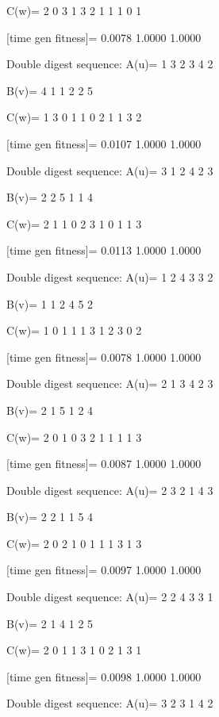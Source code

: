 C(w)=
     2     0     3     1     3     2     1     1     1     0     1

[time gen fitness]=
    0.0078    1.0000    1.0000

Double digest sequence:
A(u)=
     1     3     2     3     4     2

B(v)=
     4     1     1     2     2     5

C(w)=
     1     3     0     1     1     0     2     1     1     3     2

[time gen fitness]=
    0.0107    1.0000    1.0000

Double digest sequence:
A(u)=
     3     1     2     4     2     3

B(v)=
     2     2     5     1     1     4

C(w)=
     2     1     1     0     2     3     1     0     1     1     3

[time gen fitness]=
    0.0113    1.0000    1.0000

Double digest sequence:
A(u)=
     1     2     4     3     3     2

B(v)=
     1     1     2     4     5     2

C(w)=
     1     0     1     1     1     3     1     2     3     0     2

[time gen fitness]=
    0.0078    1.0000    1.0000

Double digest sequence:
A(u)=
     2     1     3     4     2     3

B(v)=
     2     1     5     1     2     4

C(w)=
     2     0     1     0     3     2     1     1     1     1     3

[time gen fitness]=
    0.0087    1.0000    1.0000

Double digest sequence:
A(u)=
     2     3     2     1     4     3

B(v)=
     2     2     1     1     5     4

C(w)=
     2     0     2     1     0     1     1     1     3     1     3

[time gen fitness]=
    0.0097    1.0000    1.0000

Double digest sequence:
A(u)=
     2     2     4     3     3     1

B(v)=
     2     1     4     1     2     5

C(w)=
     2     0     1     1     3     1     0     2     1     3     1

[time gen fitness]=
    0.0098    1.0000    1.0000

Double digest sequence:
A(u)=
     3     2     3     1     4     2

